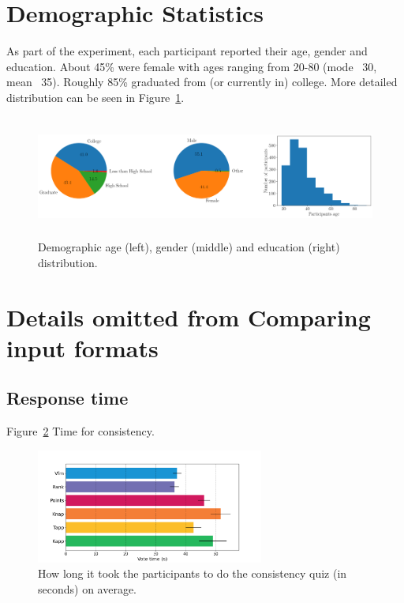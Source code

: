 \documentclass[letterpaper]{article} %
\begin{document}
\section{Demographic Statistics}
As part of the experiment, each participant reported their age, gender and education. About 45\% were female with ages ranging from 20-80 (mode ~30, mean ~35). Roughly 85\% graduated from (or currently in) college. More detailed distribution can be seen in Figure~\ref{fig:distribution}.


\begin{figure}[!h]
\begin{center}
\includegraphics[width=15cm,height=4cm]{experiment/dists.png}
\caption{Demographic age (left), gender (middle) and education (right) distribution.
}\label{fig:distribution}
\end{center}
\end{figure}




\section{Details omitted from Comparing input formats}
\subsection{Response time}
Figure~\ref{fig:consistency_time} Time for consistency. 

\begin{figure}[!h]
\begin{center}
\includegraphics[width=7.5cm]{experiment/consistency_time.png}
\caption{How long it took the participants to do the consistency quiz (in seconds) on average.
}\label{fig:consistency_time}
\end{center}
\end{figure}
\end{document}
